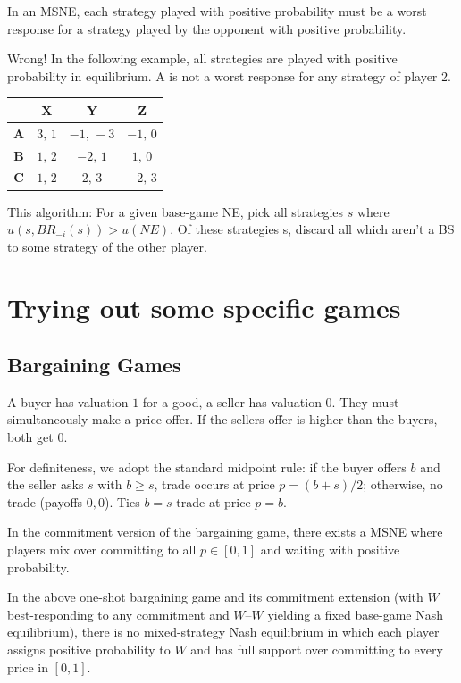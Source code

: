 \documentclass{article}
\begin{document}
\begin{conjecture}
    In an MSNE, each strategy played with positive probability must be a worst response for a strategy played by the opponent with positive probability.
\end{conjecture}
Wrong! In the following example, all strategies are played with positive probability in equilibrium. A is not a worst response for any strategy of player 2.
\begin{table}[h!]
\centering
\begin{tabular}{c|ccc}
       & \textbf{X} & \textbf{Y} & \textbf{Z} \\ \hline
  \textbf{A} & $3,\,1$ & $-1,\,-3$ & $-1,\,0$ \\[2pt]
  \textbf{B} & $1,\,2$ & $-2,\,1$ & $1,\,0$ \\[2pt]
  \textbf{C} & $1,\,2$ & $2,\,3$ & $-2,\,3$
\end{tabular}
\end{table}

\begin{conjecture}
    This algorithm:
    For a given base-game NE, pick all strategies $s$ where $u(s,BR_{-i}(s))>u(NE)$.
    Of these strategies s, discard all which aren't a BS to some strategy of the other player.
\end{conjecture}

\newpage
\section{Trying out some specific games}
\subsection{Bargaining Games}
A buyer has valuation $1$ for a good, a seller has valuation $0$. They must simultaneously make a price offer. If the sellers offer is higher than the buyers, both get $0$.

For definiteness, we adopt the standard midpoint rule: if the buyer offers $b$ and the seller asks $s$ with $b\ge s$, trade occurs at price $p=(b+s)/2$; otherwise, no trade (payoffs $0,0$). Ties $b=s$ trade at price $p=b$.

\begin{conjecture}
    In the commitment version of the bargaining game, there exists a MSNE where players mix over committing to all $p\in[0,1]$ and waiting with positive probability.
\end{conjecture}

\begin{proposition}
In the above one-shot bargaining game and its commitment extension (with $W$ best-responding to any commitment and $W$--$W$ yielding a fixed base-game Nash equilibrium), there is no mixed-strategy Nash equilibrium in which each player assigns positive probability to $W$ and has full support over committing to every price in $[0,1]$.
\end{proposition}
\end{document}
